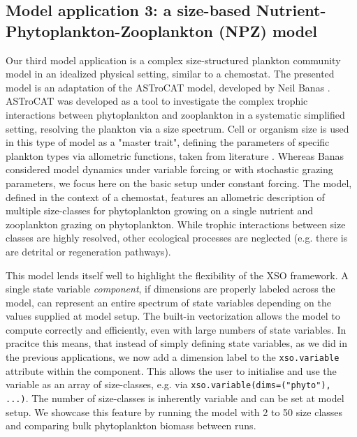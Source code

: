 \documentclass[journal abbreviation, manuscript]{copernicus}
\begin{document}
\subsection{Model application 3: a size-based Nutrient-Phytoplankton-Zooplankton (NPZ) model}

Our third model application is a complex size-structured plankton community model in an idealized physical setting, similar to a chemostat. The presented model is an adaptation of the ASTroCAT model, developed by Neil Banas \citep{Banas2011b}. ASTroCAT was developed as a tool to investigate the complex trophic interactions between phytoplankton and zooplankton in a systematic simplified setting, resolving the plankton via a size spectrum. Cell or organism size is used in this type of model as a "master trait", defining the parameters of specific plankton types via allometric functions, taken from literature \citep{Litchman2008}. 
Whereas Banas considered model dynamics under variable forcing or with stochastic grazing parameters, we focus here on the basic setup under constant forcing. The model, defined in the context of a chemostat, features an allometric description of multiple size-classes for phytoplankton growing on a single nutrient and zooplankton grazing on phytoplankton. While trophic interactions between size classes are highly resolved, other ecological processes are neglected (e.g. there is are detrital or regeneration pathways).  

This model lends itself well to highlight the flexibility of the XSO framework. A single state variable \textit{component}, if dimensions are properly labeled across the model, can represent an entire spectrum of state variables depending on the values supplied at model setup. The built-in vectorization allows the model to compute correctly and efficiently, even with large numbers of state variables. In pracitce this means, that instead of simply defining state variables, as we did in the previous applications, we now add a dimension label to the \texttt{xso.variable} attribute within the component. This allows the user to initialise and use the variable as an array of size-classes, e.g. via \texttt{xso.variable(dims=("phyto"), ...)}. The number of size-classes is inherently variable and can be set at model setup. We showcase this feature by running the model with 2 to 50 size classes and comparing bulk phytoplankton biomass between runs.
\end{document}
